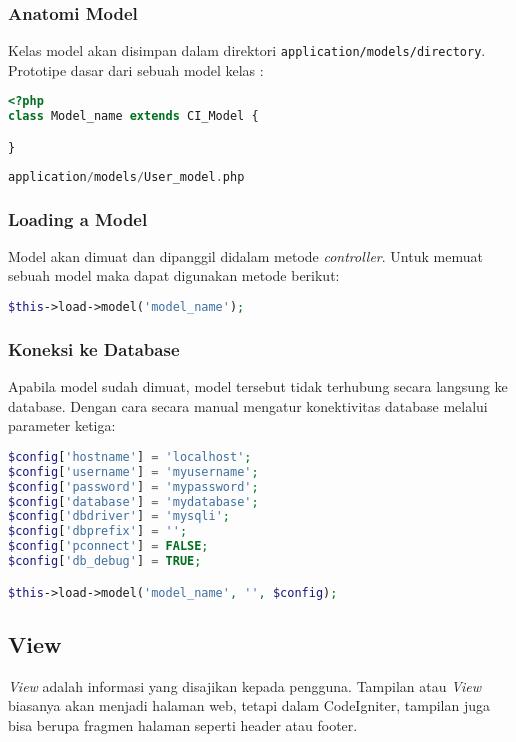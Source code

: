 \subsubsection{Anatomi Model}
\label{sssec:model_1}
Kelas model akan disimpan dalam direktori \texttt{application/models/directory}. Prototipe dasar dari sebuah model kelas :

\begin{lstlisting}[frame=single, language=PHP]  
<?php
class Model_name extends CI_Model {

}
\end{lstlisting}

\begin{lstlisting}[frame=single, language=PHP]  
application/models/User_model.php
\end{lstlisting}

\subsubsection{Loading a Model}
\label{sssec:model_2}

Model akan dimuat dan dipanggil didalam metode \textit{controller}. Untuk memuat sebuah model maka dapat digunakan metode berikut:

\begin{lstlisting}[frame=single, language=PHP] 
$this->load->model('model_name');
\end{lstlisting}

\subsubsection{Koneksi ke Database}
\label{sssec:model_3}
Apabila model sudah dimuat, model tersebut tidak terhubung secara langsung ke database. Dengan cara secara manual mengatur konektivitas database melalui parameter ketiga:

\begin{lstlisting}[frame=single, language=PHP]
$config['hostname'] = 'localhost';
$config['username'] = 'myusername';
$config['password'] = 'mypassword';
$config['database'] = 'mydatabase';
$config['dbdriver'] = 'mysqli';
$config['dbprefix'] = '';
$config['pconnect'] = FALSE;
$config['db_debug'] = TRUE;

$this->load->model('model_name', '', $config);
\end{lstlisting}

\subsection{View}
\textit{View } adalah informasi yang disajikan kepada pengguna. Tampilan atau \textit{View} biasanya akan menjadi halaman web, tetapi dalam CodeIgniter, tampilan juga bisa berupa fragmen halaman seperti header atau footer. 

